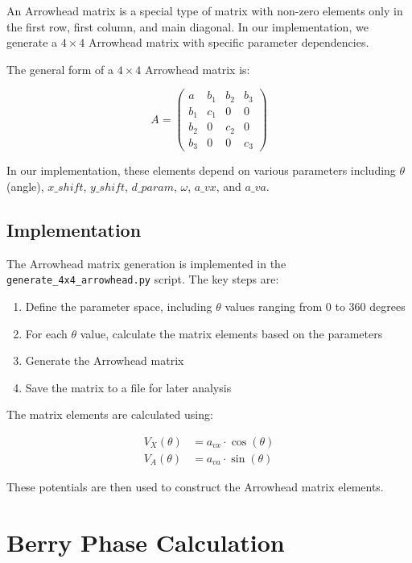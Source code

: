 \documentclass{article}
\begin{document}
An Arrowhead matrix is a special type of matrix with non-zero elements only in the first row, first column, and main diagonal. In our implementation, we generate a $4 \times 4$ Arrowhead matrix with specific parameter dependencies.

The general form of a $4 \times 4$ Arrowhead matrix is:

\begin{equation}
A = \begin{pmatrix}
a & b_1 & b_2 & b_3 \\
b_1 & c_1 & 0 & 0 \\
b_2 & 0 & c_2 & 0 \\
b_3 & 0 & 0 & c_3
\end{pmatrix}
\end{equation}

In our implementation, these elements depend on various parameters including $\theta$ (angle), $x\_shift$, $y\_shift$, $d\_param$, $\omega$, $a\_vx$, and $a\_va$.

\subsection{Implementation}

The Arrowhead matrix generation is implemented in the \texttt{generate\_4x4\_arrowhead.py} script. The key steps are:

\begin{enumerate}
    \item Define the parameter space, including $\theta$ values ranging from 0 to 360 degrees
    \item For each $\theta$ value, calculate the matrix elements based on the parameters
    \item Generate the Arrowhead matrix
    \item Save the matrix to a file for later analysis
\end{enumerate}

The matrix elements are calculated using:

\begin{align}
V_X(\theta) &= a_{vx} \cdot \cos(\theta) \\
V_A(\theta) &= a_{va} \cdot \sin(\theta)
\end{align}

These potentials are then used to construct the Arrowhead matrix elements.

\section{Berry Phase Calculation}
\end{document}

